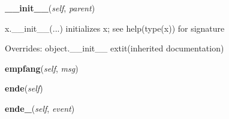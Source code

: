 \hspace{.8\funcindent}\begin{boxedminipage}{\funcwidth}

    \raggedright \textbf{\_\_init\_\_}(\textit{self}, \textit{parent})

\setlength{\parskip}{2ex}
    x.\_\_init\_\_(...) initializes x; see help(type(x)) for signature

\setlength{\parskip}{1ex}
      Overrides: object.\_\_init\_\_ 	extit{(inherited documentation)}

    \end{boxedminipage}

    \label{gui:gui:empfang}

    \vspace{0.5ex}

\hspace{.8\funcindent}\begin{boxedminipage}{\funcwidth}

    \raggedright \textbf{empfang}(\textit{self}, \textit{msg})

\setlength{\parskip}{2ex}
\setlength{\parskip}{1ex}
    \end{boxedminipage}

    \label{gui:gui:ende}

    \vspace{0.5ex}

\hspace{.8\funcindent}\begin{boxedminipage}{\funcwidth}

    \raggedright \textbf{ende}(\textit{self})

\setlength{\parskip}{2ex}
\setlength{\parskip}{1ex}
    \end{boxedminipage}

    \label{gui:gui:ende_}

    \vspace{0.5ex}

\hspace{.8\funcindent}\begin{boxedminipage}{\funcwidth}

    \raggedright \textbf{ende\_}(\textit{self}, \textit{event})

\setlength{\parskip}{2ex}
\setlength{\parskip}{1ex}
    \end{boxedminipage}

